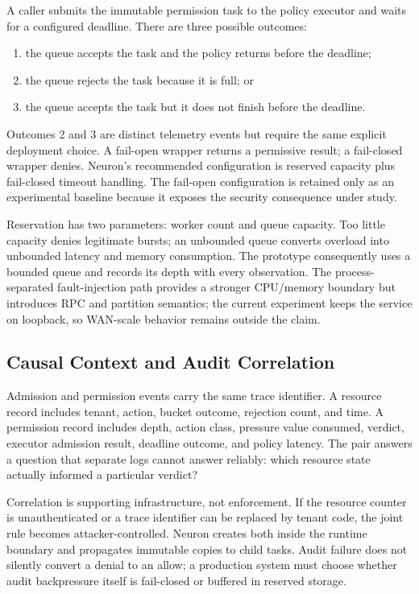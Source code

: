 A caller submits the immutable permission task to the policy executor and
waits for a configured deadline. There are three possible outcomes:

\begin{enumerate}
  \item the queue accepts the task and the policy returns before the
  deadline;
  \item the queue rejects the task because it is full; or
  \item the queue accepts the task but it does not finish before the
  deadline.
\end{enumerate}

Outcomes 2 and 3 are distinct telemetry events but require the same explicit
deployment choice. A fail-open wrapper returns a permissive result; a
fail-closed wrapper denies. Neuron's recommended configuration is reserved
capacity plus fail-closed timeout handling. The fail-open configuration is
retained only as an experimental baseline because it exposes the security
consequence under study.

Reservation has two parameters: worker count and queue capacity. Too little
capacity denies legitimate bursts; an unbounded queue converts overload into
unbounded latency and memory consumption. The prototype consequently uses a
bounded queue and records its depth with every observation. The process-
separated fault-injection path provides a stronger CPU/memory boundary but
introduces RPC and partition semantics; the current experiment keeps the
service on loopback, so WAN-scale behavior remains outside the claim.

\subsection{Causal Context and Audit Correlation}

Admission and permission events carry the same trace identifier. A resource
record includes tenant, action, bucket outcome, rejection count, and time. A
permission record includes depth, action class, pressure value consumed,
verdict, executor admission result, deadline outcome, and policy latency.
The pair answers a question that separate logs cannot answer reliably:
which resource state actually informed a particular verdict?

Correlation is supporting infrastructure, not enforcement. If the resource
counter is unauthenticated or a trace identifier can be replaced by tenant
code, the joint rule becomes attacker-controlled. Neuron creates both inside
the runtime boundary and propagates immutable copies to child tasks. Audit
failure does not silently convert a denial to an allow; a production system
must choose whether audit backpressure itself is fail-closed or buffered in
reserved storage.

